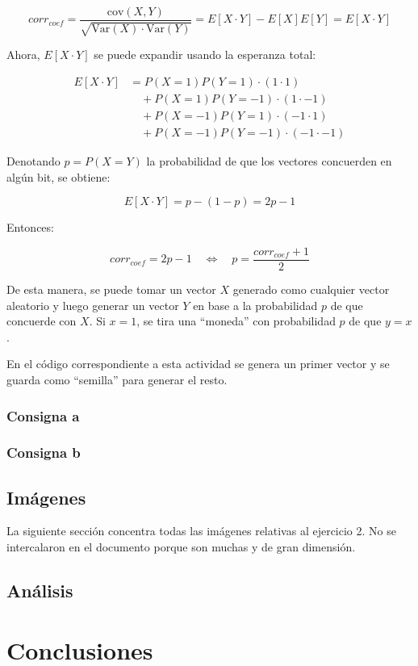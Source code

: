 \documentclass[11pt]{article} %
\begin{document}
\begin{equation}
corr_{coef} = \frac{\mathrm{cov}(X,Y)}{\sqrt{\mathrm{Var}(X)\cdot \mathrm{Var}(Y)}} =  E[X \cdot Y] - E[X]E[Y] = E[X \cdot Y]
\end{equation}

Ahora, $E[X \cdot Y]$ se puede expandir usando la esperanza total:

\begin{align*}
E[X \cdot Y] &= P(X=1)P(Y=1)\cdot (1\cdot 1) \\
&\quad + P(X=1)P(Y=-1)\cdot (1\cdot -1) \\
&\quad + P(X=-1)P(Y=1)\cdot (-1\cdot 1) \\
&\quad + P(X=-1)P(Y=-1)\cdot (-1\cdot -1)
\end{align*}

Denotando $p = P(X=Y)$ la probabilidad de que los vectores concuerden en algún bit, se obtiene:

\begin{equation}
E[X \cdot Y] = p - (1-p) = 2p-1
\end{equation}

Entonces:

\begin{equation}
corr_{coef} = 2p-1 \quad \Leftrightarrow \quad p = \frac{corr_{coef} +1}{2}
\end{equation}

De esta manera, se puede tomar un vector $X$ generado como cualquier vector aleatorio y luego generar un vector $Y$ en base a la probabilidad $p$ de que concuerde con $X$. Si $x=1$, se tira una ``moneda'' con probabilidad $p$ de que $y=x$.

En el código correspondiente a esta actividad se genera un primer vector y se guarda como ``semilla'' para generar el resto. 

\subsubsection{Consigna a}


\subsubsection{Consigna b}

\subsection{Imágenes}
La siguiente sección concentra todas las imágenes relativas al ejercicio 2. No se intercalaron en el documento porque son muchas y de gran dimensión. 

\subsection{Análisis}

\section{Conclusiones}
\end{document}
